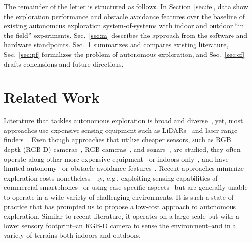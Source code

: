 \documentclass[lettersize,journal]{IEEEtran}
\theoremstyle{definition}
\begin{document}
The remainder of the letter is structured as follows. In Section~\ref{sec:fe}, data show %
the exploration performance and obstacle avoidance features 
over the baseline of existing autonomous exploration system-of-systems with indoor and outdoor ``in the field'' experiments. 
Sec.~\ref{sec:m} describes the approach from the software and hardware standpoints. Sec.~\ref{sec:rw} summarizes and compares existing literature, Sec.~\ref{sec:pf} formalizes the problem of autonomous exploration, and Sec.~\ref{sec:cf} drafts conclusions %
and future directions.


\section{Related Work}
\label{sec:rw}

Literature that tackles autonomous exploration is broad and diverse~\cite{lluvia2021active,placed2022survey,julia2012comparison}, yet, most approaches use expensive sensing equipment such as LiDARs~\cite{kohlbrecher2014hector,kulkarni2022autonomous,tranzatto2022cerberus,roucek2020darpa,ebadi2020lamp,tardioli2019ground,dang2019graph,batinovic2021multi} and laser range finders~\cite{kim2022autonomous,surmann2003autonomous}. 
Even though approaches that utilize cheaper sensors, such as RGB depth (RGB-D) cameras~\cite{tranzatto2022cerberus,kim2022autonomous,roucek2020darpa,tabib2022autonomous,ebadi2020lamp,eldemiry2022autonomous,bircher2016receding,papachristos2017uncertainty,dai2020fast}, RGB cameras~\cite{zhou2021smartphone,dang2019graph,muller2021openbot}, and sonars~\cite{zhou2021smartphone,muller2021openbot}, are studied, they often operate along other more expensive equipment~\cite{dang2019graph,ebadi2020lamp,roucek2020darpa,kim2022autonomous,tranzatto2022cerberus} or indoors only~\cite{bircher2016receding,eldemiry2022autonomous,dai2020fast,papachristos2017uncertainty,zhou2021smartphone}, and have limited autonomy~\cite{bircher2016receding,papachristos2017uncertainty,dai2020fast} or obstacle avoidance features~\cite{zhou2021smartphone,muller2021openbot}.
Recent approaches minimize exploration costs nonetheless~\cite{muller2021openbot,zhou2021smartphone,tabib2022autonomous,eldemiry2022autonomous,bircher2016receding} by, e.g., exploiting sensing capabilities of commercial smartphones~\cite{muller2021openbot,zhou2021smartphone} or using case-specific aspects~\cite{tabib2022autonomous} but are generally unable to operate in a wide variety of challenging %
environments.
%
It is such a state of practice that has prompted us to propose a low-cost approach to autonomous exploration. Similar to recent literature, it operates on a large scale but with a lower sensory footprint--an RGB-D camera to sense the environment--and in a variety of terrains both indoors and outdoors.
\end{document}
